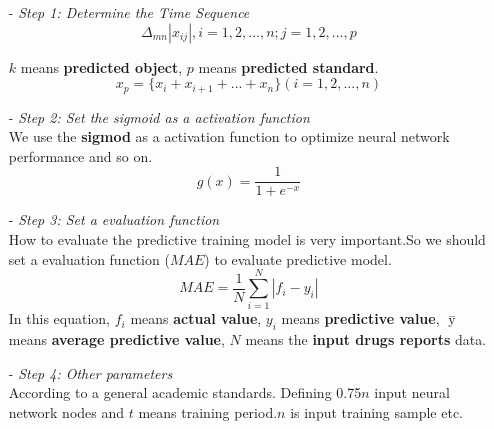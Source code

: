 \documentclass{mcmthesis}
\begin{document}
\begin{itemize}
	\item[-] \textit{Step 1: Determine the Time Sequence}\\%
	 \begin{equation}
	{\Delta _{mn}}\left. {\left| {{x_{ij}}} \right.} \right|,i = 1,2,...,n;j = 1,2,...,p
	\end{equation}
	
	$k$ means \textbf{predicted object}, $p$ means \textbf{predicted standard}.\\
	\begin{equation}
	{x_p} = \{ {x_i} + {x_{i + 1}} + ... + {x_n}\}    (i = 1,2,...,n)
	\end{equation}
	
	\item[-] \textit{Step 2: Set the sigmoid as a activation function}\\%
	We use the \textbf{sigmod} as a activation function to optimize neural network performance and so on.\\
	\begin{equation}
     	g(x) = \frac{1}{{1 + {e^{ - x}}}} 
	\end{equation}
	
	\item[-] \textit{Step 3: Set a evaluation function}\\%
	How to evaluate the predictive training model is very important.So we should set a evaluation function ($MAE$) to evaluate predictive model.\\
	\begin{equation}
		MAE = \frac{1}{N}\sum\limits_{i = 1}^N {|{f_i} - {y_i}|} 
	\end{equation}
	In this equation, $ f_i$ means \textbf{actual value}, $y_i$ means \textbf{predictive value}, $\mathop y\limits^ -  $ means \textbf{average predictive value}, $N$ means the \textbf{input drugs reports} data.\\
	\item[-] \textit{Step 4: Other parameters}\\%
    According to a general academic standards.
    Defining 0.75$n$ input neural network nodes and $t$ means training period.$n$ is input training sample etc.
\end{itemize}
\end{document}
